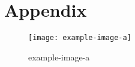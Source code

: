 %
%

\chapter*{Appendix}

\begin{figure}
\texttt{[image: example-image-a]}
\caption{example-image-a}
\end{figure}
